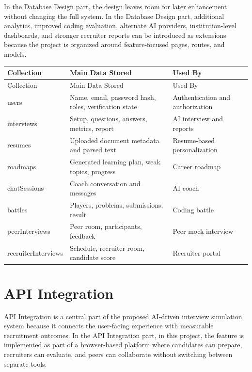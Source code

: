 \documentclass[12pt,a4paper]{report}
\begin{document}
In the Database Design part, the design leaves room for later enhancement without changing the full system. In the Database Design part, additional analytics, improved coding evaluation, alternate AI providers, institution-level dashboards, and stronger recruiter reports can be introduced as extensions because the project is organized around feature-focused pages, routes, and models.


\begin{longtable}{|>{\raggedright\arraybackslash}p{}|>{\raggedright\arraybackslash}p{}|>{\raggedright\arraybackslash}p{}|}
\hline
Collection & Main Data Stored & Used By \\
\hline
\endfirsthead
\hline
Collection & Main Data Stored & Used By \\
\hline
\endhead
users & Name, email, password hash, roles, verification state & Authentication and authorization \\
\hline
interviews & Setup, questions, answers, metrics, report & AI interview and reports \\
\hline
resumes & Uploaded document metadata and parsed text & Resume-based personalization \\
\hline
roadmaps & Generated learning plan, weak topics, progress & Career roadmap \\
\hline
chatSessions & Coach conversation and messages & AI coach \\
\hline
battles & Players, problems, submissions, result & Coding battle \\
\hline
peerInterviews & Peer room, participants, feedback & Peer mock interview \\
\hline
recruiterInterviews & Schedule, recruiter room, candidate score & Recruiter portal \\
\hline
\end{longtable}

\section{API Integration}

API Integration is a central part of the proposed AI-driven interview simulation system because it connects the user-facing experience with measurable recruitment outcomes. In the API Integration part, in this project, the feature is implemented as part of a browser-based platform where candidates can prepare, recruiters can evaluate, and peers can collaborate without switching between separate tools.
\end{document}
